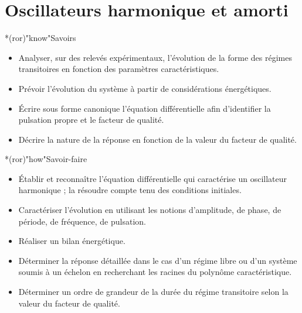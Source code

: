 \documentclass[../../main/main.tex]{subfiles}
\begin{document}
\setcounter{chapter}{3}

\chapter{Oscillateurs harmonique et amorti}

\vfill

\begin{prgm}
	\begin{tcb}*(ror)"know"{Savoirs}
		\begin{itemize}[label=$\diamond$, leftmargin=10pt]
			\item Analyser, sur des relevés expérimentaux, l'évolution de la forme des
			      régimes transitoires en fonction des paramètres caractéristiques.
			\item Prévoir l'évolution du système à partir de considérations
			      énergétiques.
			\item Écrire sous forme canonique l'équation différentielle afin
			      d'identifier la pulsation propre et le facteur de qualité.
			\item Décrire la nature de la réponse en fonction de la valeur du facteur
			      de qualité.
		\end{itemize}
	\end{tcb}

	\begin{tcb}*(ror)"how"{Savoir-faire}
		\begin{itemize}[label=$\diamond$, leftmargin=10pt]
			\item Établir et reconnaître l'équation différentielle qui caractérise un
			      oscillateur harmonique ; la résoudre compte tenu des conditions
			      initiales.
			\item Caractériser l'évolution en utilisant les notions d'amplitude, de
			      phase, de période, de fréquence, de pulsation.
			\item Réaliser un bilan énergétique.
			\item Déterminer la réponse détaillée dans le cas d'un régime libre ou
			      d'un système soumis à un échelon en recherchant les racines du
			      polynôme caractéristique.
			\item Déterminer un ordre de grandeur de la durée du régime transitoire
			      selon la valeur du facteur de qualité.
		\end{itemize}
	\end{tcb}
\end{prgm}

\vfill
\minitoc
\vfill
\end{document}
